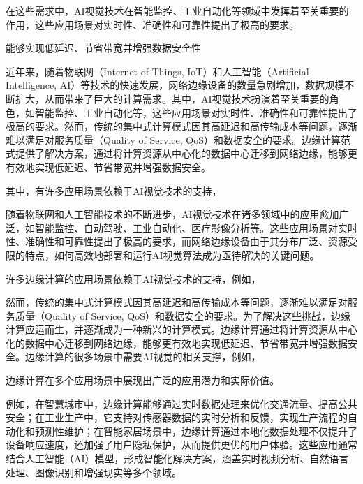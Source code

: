 在这些需求中，AI视觉技术在智能监控、工业自动化等领域中发挥着至关重要的作用，这些应用场景对实时性、准确性和可靠性提出了极高的要求。





能够实现低延迟、节省带宽并增强数据安全性




近年来，随着物联网（Internet of Things, IoT）和人工智能（Artificial Intelligence, AI）等技术的快速发展，网络边缘设备的数量急剧增加，数据规模不断扩大，从而带来了巨大的计算需求。其中，AI视觉技术扮演着至关重要的角色，如智能监控、工业自动化等，这些应用场景对实时性、准确性和可靠性提出了极高的要求。然而，传统的集中式计算模式因其高延迟和高传输成本等问题，逐渐难以满足对服务质量（Quality of Service, QoS）和数据安全的要求。边缘计算范式提供了解决方案，通过将计算资源从中心化的数据中心迁移到网络边缘，能够更有效地实现低延迟、节省带宽并增强数据安全\cite{chowdhury2019co,khan2019edge,liu2019survey,施巍松2019边缘计算,刘通2021边缘计算中任务卸载研究综述}。


其中，有许多应用场景依赖于AI视觉技术的支持，


随着物联网和人工智能技术的不断进步，AI视觉技术在诸多领域中的应用愈加广泛，如智能监控、自动驾驶、工业自动化、医疗影像分析等。这些应用场景对实时性、准确性和可靠性提出了极高的要求，而网络边缘设备由于其分布广泛、资源受限的特点，如何高效地部署和运行AI视觉算法成为亟待解决的关键问题。


许多边缘计算的应用场景依赖于AI视觉技术的支持，例如，


然而，传统的集中式计算模式因其高延迟和高传输成本等问题，逐渐难以满足对服务质量（Quality of Service, QoS）和数据安全的要求。为了解决这些挑战，边缘计算应运而生，并逐渐成为一种新兴的计算模式。边缘计算通过将计算资源从中心化的数据中心迁移到网络边缘，能够更有效地实现低延迟、节省带宽并增强数据安全\cite{chowdhury2019co,khan2019edge,liu2019survey,施巍松2019边缘计算,刘通2021边缘计算中任务卸载研究综述}。边缘计算的很多场景中需要AI视觉的相关支撑，例如，

边缘计算在多个应用场景中展现出广泛的应用潜力和实际价值。


例如，在智慧城市中，边缘计算能够通过实时数据处理来优化交通流量、提高公共安全\cite{lin2016real,jia2017edge,mohamed2017smartcityware,mallapuram2017smart,dalla2017using}；在工业生产中，它支持对传感器数据的实时分析和反馈，实现生产流程的自动化和预测性维护\cite{yin2015big,yan2017industrial,zhang2017self,peres2018idarts,mohamed2019leveraging}；在智能家居场景中，边缘计算通过本地化数据处理不仅提升了设备响应速度，还加强了用户隐私保护，从而提供更优的用户体验\cite{savio2018smart,krejcar2020technology,黄倩怡2020智能家居中的边缘计算}。这些应用通常结合人工智能（AI）模型，形成智能化解决方案，涵盖实时视频分析、自然语言处理、图像识别和增强现实等多个领域\cite{deng2020edge,gill2025edge}。



